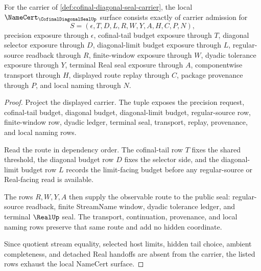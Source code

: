 \begin{theorem}
\label{thm:cofinal-diagonal-seal-namecert-obligations}
For the carrier of \autoref{def:cofinal-diagonal-seal-carrier}, the local $\NameCert_{\CofinalDiagonalSealUp}$ surface consists exactly of carrier admission for
$$
S=(\epsilon,T,D,L,R,W,Y,A,H,C,P,N),
$$
precision exposure through $\epsilon$, cofinal-tail budget exposure through $T$, diagonal selector exposure through $D$, diagonal-limit budget exposure through $L$, regular-source readback through $R$, finite-window exposure through $W$, dyadic tolerance exposure through $Y$, terminal Real seal exposure through $A$, componentwise transport through $H$, displayed route replay through $C$, package provenance through $P$, and local naming through $N$.
\end{theorem}
\begin{proof}
Project the displayed carrier. The tuple exposes the precision request, cofinal-tail budget, diagonal budget, diagonal-limit budget, regular-source row, finite-window row, dyadic ledger, terminal seal, transport, replay, provenance, and local naming rows.

Read the route in dependency order. The cofinal-tail row $T$ fixes the shared threshold, the diagonal budget row $D$ fixes the selector side, and the diagonal-limit budget row $L$ records the limit-facing budget before any regular-source or Real-facing read is available.

The rows $R,W,Y,A$ then supply the observable route to the public seal: regular-source readback, finite StreamName window, dyadic tolerance ledger, and terminal $\RealUp$ seal. The transport, continuation, provenance, and local naming rows preserve that same route and add no hidden coordinate.

Since quotient stream equality, selected host limits, hidden tail choice, ambient completeness, and detached Real handoffs are absent from the carrier, the listed rows exhaust the local NameCert surface.
\end{proof}

